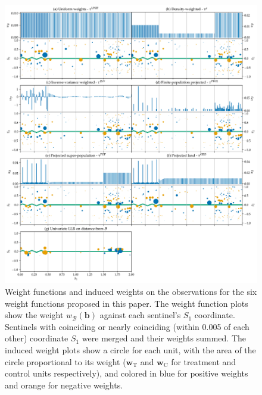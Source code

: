 \documentclass[letter,12pt]{article}
\newcommand{\treat}{\mathrm{T}}
\newcommand{\ctrol}{\mathrm{C}}
\newcommand{\wvec}{\mathbold{w}}
\newcommand{\border}{\mathcal{B}}
\newcommand{\sentinel}{\bm{b}}
\newcommand{\weightb}{w_{\border}}
\newcommand{\wt}{\wvec_{\treat}}
\newcommand{\wc}{\wvec_{\ctrol}}
\begin{document}
\begin{figure}[ptb]
\centering
\includegraphics[width=\textwidth]{../figures/weight_functions.png}
\caption{\label{fig:weight_functions}Weight functions and induced weights on the observations for the six weight functions proposed in this paper. The weight function plots show the weight \(\weightb(\sentinel)\) against each sentinel's \(S_1\) coordinate. Sentinels with coinciding or nearly coinciding (within 0.005 of each other) coordinate \(S_1\) were merged and their weights summed. The induced weight plots show a circle for each unit, with the area of the circle proportional to its weight (\(\wt\) and \(\wc\) for treatment and control units respectively), and colored in blue for positive weights and orange for negative weights.}
\end{figure}
    
\end{document}
